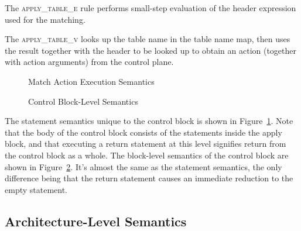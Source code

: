 \documentclass[UTF8]{article}
\begin{document}
The \textsc{apply\_table\_e} rule performs small-step evaluation of the header expression used for the matching.

The \textsc{apply\_table\_v} looks up the table name in the table name map, then uses the result together with the header to be looked up to obtain an action (together with action arguments) from the control plane.

\begin{figure}[ht!]
\ottusedrule{\ottdrulestmtXXapplyXXtableXXe{}}
\ottusedrule{\ottdrulestmtXXapplyXXtableXXv{}}
\caption{Match Action Execution Semantics}
\label{fig:semmatchaction}
\end{figure}

\begin{figure}[ht!]
\ottdefnsctrlXXsem
\caption{Control Block-Level Semantics}
\label{fig:semctrl}
\end{figure}

The statement semantics unique to the control block is shown in Figure~\ref{fig:semmatchaction}. Note that the body of the control block consists of the statements inside the apply block, and that executing a return statement at this level signifies return from the control block as a whole. The block-level semantics of the control block are shown in Figure~\ref{fig:semctrl}. It's almost the same as the statement semantics, the only difference being that the return statement causes an immediate reduction to the empty statement.

\newcommand{\actx}{\ensuremath{\mathit{ctx}_\mathit{A}}}
\newcommand{\abl}{\ensuremath{\overline{ab}}}
\newcommand{\pbm}{\ensuremath{B_p}}
\newcommand{\ffbm}{\ensuremath{B_{ \mathit{ff}}}}
\newcommand{\aenv}{\ensuremath{\mathit{env}_\mathit{A}}}
\subsection{Architecture-Level Semantics}
\end{document}
